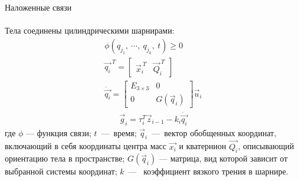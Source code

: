\begin{frame}[t]{Наложенные связи}
    \framesubtitle{}
    Тела соединены цилиндрическими шарнирами:
    \begin{align}
        \phi(q_{j_1},\ \cdots,\ q_{j_k},\ t) \geqslant  0 \\
        \vec{q_i}^{\ T} = \begin{bmatrix}
                              \vec{x}_i^{\ T} & \vec{Q}_i^{\ T}
                          \end{bmatrix}                   \\
        \dot{\vec{q_i}} = \begin{bmatrix}
                              E_{3\times3} & 0            \\
                              0            & G(\vec{q}_i)
                          \end{bmatrix}\vec{u}_i
    \end{align}
    \begin{align}
        \vec{g}_i = \tau_i^T \vec{z}_{i-1} -k_i \dot{\vec{q_i}}
    \end{align}
    где $\phi$ --- функция связи; $t$~---~время; $\vec{q}_{i}$~---~вектор обобщенных координат, включающий в себя координаты центра масс $\vec{x_i}$ и кватернион $\vec{Q_i}$, описывающий ориентацию тела в пространстве; $G(\vec{q}_i)$ --- матрица, вид которой зависит от выбранной системы координат; $k$~---~ коэффициент вязкого трения в шарнире.
\end{frame}


